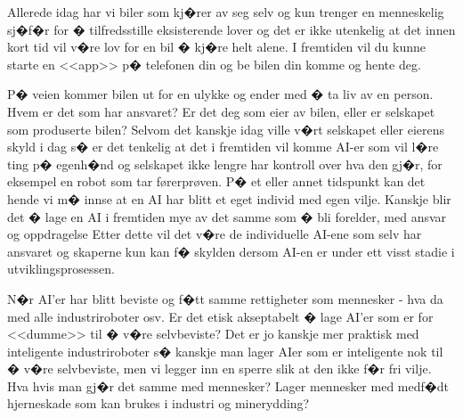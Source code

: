 Allerede idag har vi biler som kj�rer av seg selv og kun trenger en
menneskelig sj�f�r for � tilfredsstille eksisterende lover og det er ikke
utenkelig at det innen kort tid vil v�re lov for en bil � kj�re helt alene. I fremtiden vil du kunne starte en <<app>> p� telefonen din og be bilen din komme og hente deg.

P� veien kommer bilen ut for en ulykke og ender med � ta liv av en person.
Hvem er det som har ansvaret? Er det deg som eier av bilen, eller er
selskapet som produserte bilen? Selvom det kanskje idag ville v�rt selskapet eller eierens skyld i dag s� er det tenkelig at det i fremtiden vil komme AI-er som vil l�re ting p� egenh�nd og selskapet ikke lengre har kontroll over hva den gj�r, for eksempel en robot som tar førerprøven. P� et eller annet tidspunkt kan det hende vi m� innse at en AI har blitt et eget individ med
egen vilje. Kanskje blir det � lage en AI i fremtiden mye av det samme som � bli forelder, med ansvar og oppdragelse
Etter dette vil det v�re de individuelle AI-ene som selv har ansvaret og
skaperne kun kan f� skylden dersom AI-en er under ett visst stadie i utviklingsprosessen.

N�r AI'er har blitt beviste og f�tt samme rettigheter som mennesker - hva da
med alle industriroboter osv. Er det etisk akseptabelt � lage AI'er som er for
<<dumme>> til � v�re selvbeviste? Det er jo kanskje mer praktisk med inteligente industriroboter s� kanskje man
lager AIer som er inteligente nok til � v�re selvbeviste, men vi legger inn en
sperre slik at den ikke f�r fri vilje. Hva hvis man gj�r det samme med
mennesker? Lager mennesker med medf�dt hjerneskade som kan brukes i industri
og minerydding? 
